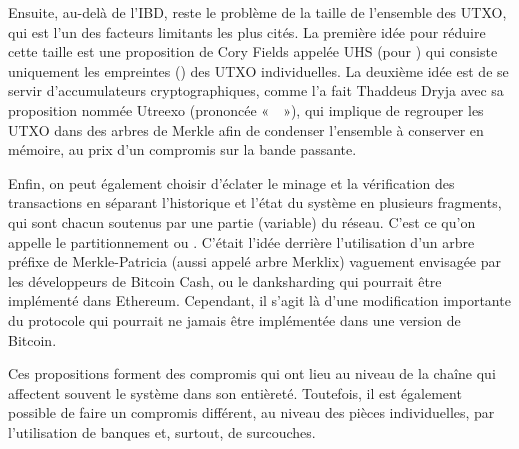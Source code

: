 Ensuite, au-delà de l'IBD, reste le problème de la taille de l'ensemble des UTXO, qui est l'un des facteurs limitants les plus cités. La première idée pour réduire cette taille est une proposition de Cory Fields appelée UHS (pour ) qui consiste uniquement les empreintes () des UTXO individuelles. La deuxième idée est de se servir d'accumulateurs cryptographiques, comme l'a fait Thaddeus Dryja avec sa proposition nommée Utreexo (prononcée «~~»), qui implique de regrouper les UTXO dans des arbres de Merkle afin de condenser l'ensemble à conserver en mémoire, au prix d'un compromis sur la bande passante.


Enfin, on peut également choisir d'éclater le minage et la vérification des transactions en séparant l'historique et l'état du système en plusieurs fragments, qui sont chacun soutenus par une partie (variable) du réseau. C'est ce qu'on appelle le partitionnement ou . C'était l'idée derrière l'utilisation d'un arbre préfixe de Merkle-Patricia (aussi appelé arbre Merklix) vaguement envisagée par les développeurs de Bitcoin Cash, ou le danksharding qui pourrait être implémenté dans Ethereum. Cependant, il s'agit là d'une modification importante du protocole qui pourrait ne jamais être implémentée dans une version de Bitcoin.

%
Ces propositions forment des compromis qui ont lieu au niveau de la chaîne qui affectent souvent le système dans son entièreté. Toutefois, il est également possible de faire un compromis différent, au niveau des pièces individuelles, par l'utilisation de banques et, surtout, de surcouches.

